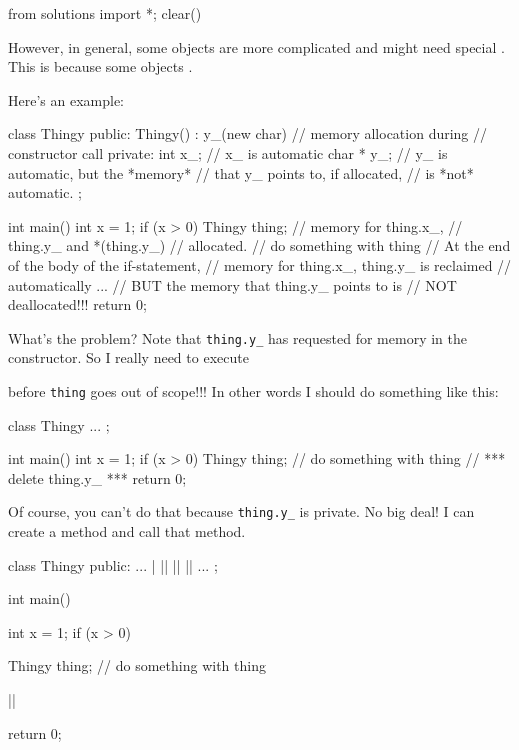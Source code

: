 \begin{python0}
from solutions import *; clear()
\end{python0}

However, in general, some objects are more complicated and might need
special . This is because some objects
.

Here's an example:

\begin{consolethree}[escapeinside=||]
class Thingy
{
public:
    Thingy()
        : y_(new char) // memory allocation during
    {}                 // constructor call
private:
    int x_;     // x_ is automatic
    char * y_;  // y_ is automatic, but the *memory*
                // that y_ points to, if allocated,
                // is *not* automatic.
};

int main()
{
    int x = 1;
    if (x > 0)
    {
        Thingy thing; // memory for thing.x_,
                      // thing.y_ and *(thing.y_)
                      // allocated.
        // do something with thing
    } // At the end of the body of the if-statement,
      // memory for thing.x_, thing.y_ is reclaimed
      // automatically ...
      // BUT the memory that thing.y_ points to is
      // NOT deallocated!!!
    return 0;
}
\end{consolethree}

What's the problem? Note that \texttt{thing.y\_} has
requested for memory in the constructor. So I really need to execute


before \texttt{thing} goes out of scope!!! In other words I should do
something like this:

\begin{consolethree}[escapeinside=||]
class Thingy
{
    ...
};

int main()
{
    int x = 1;
    if (x > 0)
    {
        Thingy thing;
        // do something with thing
        // *** delete thing.y_ ***
    }
    return 0;
}
\end{consolethree}

Of course, you can't do that because \texttt{thing.y\_} is
private. No big deal! I can create a method and call that method.

\begin{consolethree}[escapeinside=||]
class Thingy
{
public:
    ...
    |
    |\EMPHASIZE{\{}|
        ||
    |\EMPHASIZE{\}}|
    ...
};

int main()
{
    int x = 1;
    if (x > 0)
    {
        Thingy thing;
        // do something with thing
        
        ||
    }
    return 0;
}
\end{consolethree}

